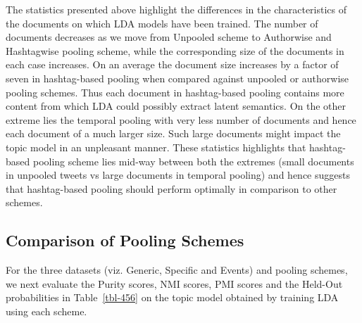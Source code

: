 \documentclass{sig-alternate}
\begin{document}
The statistics presented above highlight the differences in the
characteristics of the documents on which LDA models have been
trained. The number of documents decreases as we move from Unpooled
scheme to Authorwise and Hashtagwise pooling scheme, while the
corresponding size of the documents in each case increases. On an
average the document size increases by a factor of seven in hashtag-based
pooling when compared against unpooled or authorwise pooling
schemes. Thus each document in hashtag-based pooling contains more
content from which LDA could possibly extract latent semantics. On the
other extreme lies the temporal pooling with very less number of
documents and hence each document of a much larger size. Such large
documents might impact the topic model in an unpleasant manner. These
statistics highlights that hashtag-based pooling scheme lies mid-way
between both the extremes (small documents in unpooled tweets vs large
documents in temporal pooling) and hence suggests that hashtag-based
pooling should perform optimally in comparison to other schemes.

\subsection{Comparison of Pooling Schemes}

For the three datasets (viz. Generic, Specific and Events) and pooling
schemes, we next evaluate the Purity scores, NMI scores, PMI scores and the Held-Out probabilities
in Table~\ref{tbl-456} on the topic model obtained by training LDA
using each scheme.
\end{document}
